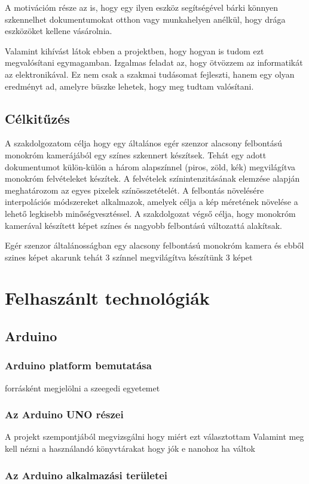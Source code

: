 \documentclass[]{thesis-ekf}
\theoremstyle{definition}
\theoremstyle{remark}
\begin{document}
A motivációm része az is, hogy egy ilyen eszköz segítségével bárki könnyen szkennelhet dokumentumokat otthon vagy munkahelyen anélkül, hogy drága eszközöket kellene vásárolnia. 

Valamint kihívást látok ebben a projektben, hogy hogyan is tudom ezt megvalósítani egymagamban. Izgalmas feladat az, hogy ötvözzem az informatikát az elektronikával. Ez nem csak a szakmai tudásomat fejleszti, hanem egy olyan eredményt ad, amelyre büszke lehetek, hogy meg tudtam valósítani.
\section{Célkitűzés}
A szakdolgozatom célja hogy egy általános egér szenzor alacsony felbontású monokróm kamerájából egy színes szkennert készítsek. Tehát egy adott dokumentumot külön-külön a három alapszínnel (piros, zöld, kék) megvilágítva monokróm felvételeket készítek. A felvételek színintenzitásának elemzése alapján meghatározom az egyes pixelek színösszetételét. A felbontás növelésére interpolációs módszereket alkalmazok, amelyek célja a kép méretének növelése a lehető legkisebb minőségvesztéssel. A szakdolgozat végső célja, hogy monokróm kamerával készített képet színes és nagyobb felbontású változattá alakítsak.

Egér szenzor általánosságban egy alacsony felbontású monokróm kamera és ebből szines képet akarunk tehát 3 színnel megvilágítva készítünk 3 képet
\chapter{Felhaszánlt technológiák}
\section{Arduino}
\subsection{Arduino platform bemutatása}
forrásként megjelölni a szeegedi egyetemet
\subsection{Az Arduino UNO részei}
A projekt szempontjából megvizsgálni hogy miért ezt választottam
Valamint meg kell nézni a használandó könyvtárakat hogy jók e nanohoz ha váltok
\subsection{Az Arduino alkalmazási területei}
\end{document}
